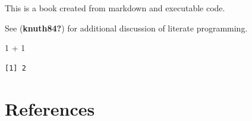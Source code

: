 \documentclass[
  letterpaper,
  DIV=11,
  numbers=noendperiod]{scrreprt}
\newenvironment{Shaded}{\begin{snugshade}}{\end{snugshade}}
\newcommand{\DecValTok}[1]{\textcolor[rgb]{0.68,0.00,0.00}{#1}}
\newcommand{\SpecialCharTok}[1]{\textcolor[rgb]{0.37,0.37,0.37}{#1}}
\newlength{\cslhangindent}
\newenvironment{CSLReferences}[2] %
 {\begin{list}{}{%
  \setlength{\itemindent}{0pt}
  \setlength{\leftmargin}{0pt}
  \setlength{\parsep}{0pt}
  \ifodd #1
   \setlength{\leftmargin}{\cslhangindent}
   \setlength{\itemindent}{-1\cslhangindent}
  \fi
  \setlength{\itemsep}{#2\baselineskip}}}
 {\end{list}}
\begin{document}
This is a book created from markdown and executable code.

See (\textbf{knuth84?}) for additional discussion of literate
programming.

\begin{Shaded}
\begin{Highlighting}[]
\DecValTok{1} \SpecialCharTok{+} \DecValTok{1}
\end{Highlighting}
\end{Shaded}

\begin{verbatim}
[1] 2
\end{verbatim}


\chapter*{References}\label{references}


\label{refs}
\begin{CSLReferences}{0}{1}
\end{CSLReferences}
\end{document}
